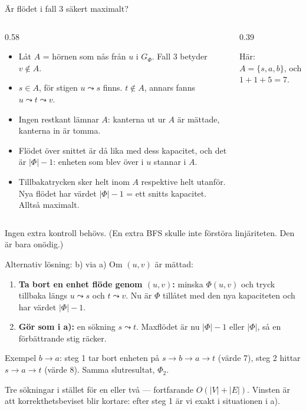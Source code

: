 {\kaninbg
\begin{frame}{\kh Är flödet i fall 3 säkert maximalt?}
\begin{columns}[T]
\begin{column}{0.58\textwidth}
\small
\footnotesize
\begin{itemize}\setlength{\itemsep}{2pt}
  \item Låt $A$ = hörnen som nås från $u$ i $G_\Phi$. Fall 3 betyder $v\notin A$.
  \item $s\in A$, för stigen $u\leadsto s$ finns. $t\notin A$, annars fanns $u\leadsto t\leadsto v$.
  \item Ingen restkant lämnar $A$: kanterna ut ur $A$ är mättade, kanterna in är tomma.
  \item Flödet över snittet är då lika med dess kapacitet, och det är $|\Phi|-1$: enheten som
        blev över i $u$ stannar i $A$.
  \item Tillbakatrycken sker helt inom $A$ respektive helt utanför. Nya flödet har värdet
        $|\Phi|-1$ = ett snitts kapacitet. Alltså maximalt.
\end{itemize}
\end{column}
\begin{column}{0.39\textwidth}
\centering
\par
{\footnotesize Här: $A=\{s,a,b\}$, och $1+1+5=7$.}
\end{column}
\end{columns}
\vfill
\begin{kaninbox}[fontupper=\footnotesize]
Ingen extra kontroll behövs. (En extra BFS skulle inte förstöra linjäriteten. Den är bara onödig.)
\end{kaninbox}
\end{frame}}

{\kaninbg
\begin{frame}{\kh Alternativ lösning: b) via a)}
\small
Om $(u,v)$ är mättad:
\begin{enumerate}\setlength{\itemsep}{3pt}
  \item \textbf{Ta bort en enhet flöde genom $(u,v)$:} minska $\Phi(u,v)$ och tryck tillbaka
        längs $u\leadsto s$ och $t\leadsto v$. Nu är $\Phi$ tillåtet med den nya kapaciteten och
        har värdet $|\Phi|-1$.
  \item \textbf{Gör som i a):} en sökning $s\leadsto t$. Maxflödet är nu $|\Phi|-1$ eller
        $|\Phi|$, så en förbättrande stig räcker.
\end{enumerate}
\medskip
Exempel $b\to a$: steg 1 tar bort enheten på $s\to b\to a\to t$ (värde 7), steg 2 hittar
$s\to a\to t$ (värde 8). Samma slutresultat, $\Phi_2$.
\vfill
\begin{kaninbox}[fontupper=\footnotesize]
Tre sökningar i stället för en eller två — fortfarande $O(|V|+|E|)$. Vinsten är att
korrekthetsbeviset blir kortare: efter steg 1 är vi exakt i situationen i a).
\end{kaninbox}
\end{frame}}

